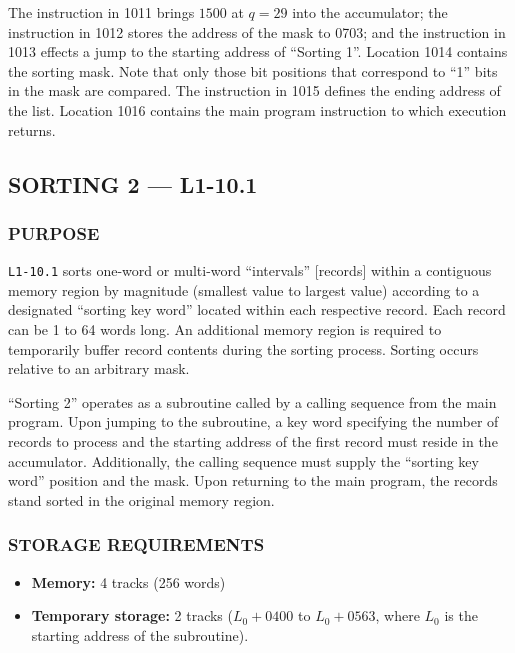The instruction in 1011 brings $1500$ at $q=29$ into the accumulator; the instruction in 1012 stores the address of the mask to 0703; and the instruction in 1013 effects a jump to the starting address of ``Sorting 1''. Location 1014 contains the sorting mask. Note that only those bit positions that correspond to ``1'' bits in the mask are compared. The instruction in 1015 defines the ending address of the list. Location 1016 contains the main program instruction to which execution returns.

\pagebreak

\subsection*{SORTING 2 --- L1-10.1}

\subsubsection*{PURPOSE}
\texttt{L1-10.1} sorts one-word or multi-word ``intervals'' [records] within a contiguous memory region by magnitude (smallest value to largest value) according to a designated ``sorting key word'' located within each respective record. Each record can be 1 to 64 words long. An additional memory region is required to temporarily buffer record contents during the sorting process. Sorting occurs relative to an arbitrary mask.

``Sorting 2'' operates as a subroutine called by a calling sequence from the main program. Upon jumping to the subroutine, a key word specifying the number of records to process and the starting address of the first record must reside in the accumulator. Additionally, the calling sequence must supply the ``sorting key word'' position and the mask. Upon returning to the main program, the records stand sorted in the original memory region.

\subsubsection*{STORAGE REQUIREMENTS}
\begin{itemize}
    \item[] \textbf{Memory:} 4 tracks (256 words)
    \item[] \textbf{Temporary storage:} 2 tracks ($L_0 + 0400$ to $L_0 + 0563$, where $L_0$ is the starting address of the subroutine).
\end{itemize}

